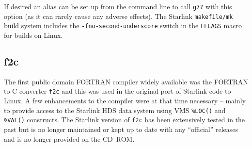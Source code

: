 \documentclass[twoside,11pt]{article}
\newcommand{\xlabel}[1]{}
\renewcommand{\_}{\texttt{\symbol{95}}}
\newcommand{\cdrom}{CD--ROM}
\newcommand{\cdrom}{CD-ROM}
\begin{document}
If desired an alias can be set up from the command line to call
\texttt{g77} with this option (as it can rarely cause any adverse
effects).  The Starlink \texttt{makefile/mk} build system includes the
\texttt{-fno-second-underscore} switch in the \texttt{FFLAGS} macro for
builds on Linux.

\subsection{\xlabel{f2c}f2c}
\label{f2c}

The first public domain FORTRAN compiler widely available was the 
FORTRAN to C converter \texttt{f2c} and this was used in the
original port of Starlink code to Linux.  A few enhancements to the
compiler were at that time necessary -- mainly to provide access to the
Starlink HDS data system using VMS \texttt{\%LOC()} and \texttt{\%VAL()}
constructs.  The Starlink version of \texttt{f2c} has been extensively
tested in the past but is no longer maintained or kept up to date with any
``official'' releases and is no longer provided on the \cdrom.  
\end{document}
